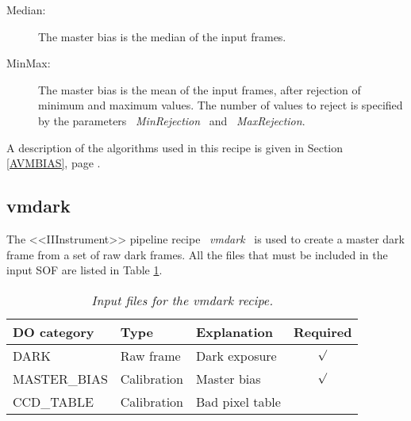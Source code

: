 \begin{description}
\begin{description}
  \item [Median:]   The master bias is the median of the input frames.

  \item [MinMax:]   The master bias is the mean of the input frames, after
                    rejection of minimum and maximum values.
                    The number of values to reject is specified by the 
                    parameters \ {\it MinRejection} \ and \ {\it MaxRejection}.

\end{description}


\end{description}

A description of the algorithms used in this recipe is given in Section
\ref{AVMBIAS}, page \pageref{AVMBIAS}.


\subsection{vmdark}
\label{sec:UVMDARK}

The <<IIInstrument>> pipeline recipe \ {\it vmdark} \ is used to create a master 
dark frame from a set of raw dark frames. All the files that must be 
included in the input SOF are listed in Table \ref{tab:IVMDARK}.

\begin{table}[h]
  \begin{center}
    \begin{tabular}{|l|l|l|c|}
    \hline
      {\bf DO category} & {\bf Type} & {\bf Explanation} & {\bf Required} \\
    \hline 
      DARK            & Raw frame   & Dark exposure         & $\surd$ \\
      MASTER\_BIAS    & Calibration & Master bias           & $\surd$ \\
      CCD\_TABLE      & Calibration & Bad pixel table       &         \\
    \hline
    \end{tabular}
    \caption{\it Input files for the vmdark recipe.}
    \label{tab:IVMDARK}
  \end{center}
\end{table}

